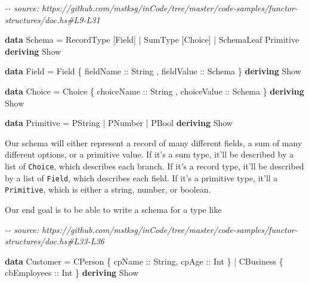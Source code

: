 \documentclass[]{article}
\newenvironment{Shaded}{}{}
\newcommand{\CommentTok}[1]{\textcolor[rgb]{0.38,0.63,0.69}{\textit{#1}}}
\newcommand{\DataTypeTok}[1]{\textcolor[rgb]{0.56,0.13,0.00}{#1}}
\newcommand{\KeywordTok}[1]{\textcolor[rgb]{0.00,0.44,0.13}{\textbf{#1}}}
\newcommand{\NormalTok}[1]{#1}
\newcommand{\OperatorTok}[1]{\textcolor[rgb]{0.40,0.40,0.40}{#1}}
\newcommand{\OtherTok}[1]{\textcolor[rgb]{0.00,0.44,0.13}{#1}}
\begin{document}
\begin{Shaded}
\begin{Highlighting}[]
\CommentTok{{-}{-} source: https://github.com/mstksg/inCode/tree/master/code{-}samples/functor{-}structures/doc.hs\#L9{-}L31}

\KeywordTok{data} \DataTypeTok{Schema} \OtherTok{=}
      \DataTypeTok{RecordType}\NormalTok{  [}\DataTypeTok{Field}\NormalTok{]}
    \OperatorTok{|} \DataTypeTok{SumType}\NormalTok{     [}\DataTypeTok{Choice}\NormalTok{]}
    \OperatorTok{|} \DataTypeTok{SchemaLeaf}  \DataTypeTok{Primitive}
  \KeywordTok{deriving} \DataTypeTok{Show}

\KeywordTok{data} \DataTypeTok{Field} \OtherTok{=} \DataTypeTok{Field}
\NormalTok{    \{}\OtherTok{ fieldName  ::} \DataTypeTok{String}
\NormalTok{    ,}\OtherTok{ fieldValue ::} \DataTypeTok{Schema}
\NormalTok{    \}}
  \KeywordTok{deriving} \DataTypeTok{Show}

\KeywordTok{data} \DataTypeTok{Choice} \OtherTok{=} \DataTypeTok{Choice}
\NormalTok{    \{}\OtherTok{ choiceName  ::} \DataTypeTok{String}
\NormalTok{    ,}\OtherTok{ choiceValue ::} \DataTypeTok{Schema}
\NormalTok{    \}}
  \KeywordTok{deriving} \DataTypeTok{Show}

\KeywordTok{data} \DataTypeTok{Primitive} \OtherTok{=}
      \DataTypeTok{PString}
    \OperatorTok{|} \DataTypeTok{PNumber}
    \OperatorTok{|} \DataTypeTok{PBool}
  \KeywordTok{deriving} \DataTypeTok{Show}
\end{Highlighting}
\end{Shaded}

Our schema will either represent a record of many different fields, a sum of
many different options, or a primitive value. If it's a sum type, it'll be
described by a list of \texttt{Choice}, which describes each branch. If it's a
record type, it'll be described by a list of \texttt{Field}, which describes
each field. If it's a primitive type, it'll a \texttt{Primitive}, which is
either a string, number, or boolean.

Our end goal is to be able to write a schema for a type like

\begin{Shaded}
\begin{Highlighting}[]
\CommentTok{{-}{-} source: https://github.com/mstksg/inCode/tree/master/code{-}samples/functor{-}structures/doc.hs\#L33{-}L36}

\KeywordTok{data} \DataTypeTok{Customer} \OtherTok{=}
      \DataTypeTok{CPerson}\NormalTok{   \{}\OtherTok{ cpName ::} \DataTypeTok{String}\NormalTok{,}\OtherTok{ cpAge ::} \DataTypeTok{Int}\NormalTok{ \}}
    \OperatorTok{|} \DataTypeTok{CBusiness}\NormalTok{ \{}\OtherTok{ cbEmployees ::} \DataTypeTok{Int}\NormalTok{ \}}
  \KeywordTok{deriving} \DataTypeTok{Show}
\end{Highlighting}
\end{Shaded}
\end{document}
